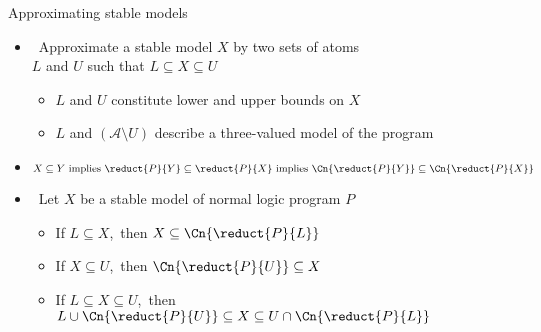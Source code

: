 \begin{frame}{Approximating stable models}
  \medskip
  \begin{itemize}
  \item<1->  \ Approximate a stable model $X$ by two sets of atoms\\
    $L$ and $U$ such that
    \(
    L\subseteq X\subseteq U
    \)
    \begin{itemize}\normalsize
    \item $L$ and $U$ constitute lower and upper bounds on $X$
    \item $L$ and $(\mathcal{A}\setminus U)$ describe a three-valued model of the program
    \end{itemize}
    \smallskip
  \item<2-> 
    \[
    X\subseteq Y
    \text{ implies }
    \reduct{P}{Y}\subseteq \reduct{P}{X}
    \text{ implies }
    \Cn{\reduct{P}{Y}}\subseteq\Cn{\reduct{P}{X}}
    \]
  \item<3->  \
    Let $X$ be a stable model of normal logic program $P$
    \begin{itemize}\normalsize
    \item<4-> If $L\subseteq X$,\pause[5]\
      then $X\subseteq\Cn{\reduct{P}{L}}$
    \item<6-> If $X\subseteq U$,\pause[7]\
      then $\Cn{\reduct{P}{U}}\subseteq X$
    \item<8-> If $L\subseteq X\subseteq U$,\pause[9]\
      then $L\cup\Cn{\reduct{P}{U}}\subseteq X\subseteq U\cap\Cn{\reduct{P}{L}}$
    \end{itemize}
  \end{itemize}
\end{frame}

